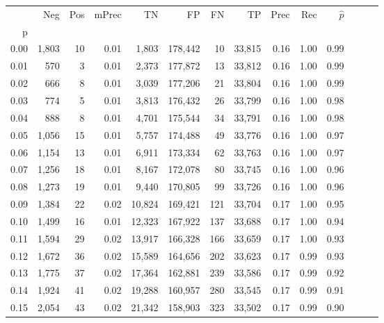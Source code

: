 \begin{tabular}{rrrrrrrrrrrrrr}
\toprule
{} &    Neg &  Pos & mPrec &       TN &       FP &      FN &      TP &  Prec &   Rec & $\hat{p}$ \\
p    &        &      &       &          &          &         &         &       &       &           \\
\midrule
0.00 &  1,803 &   10 &  0.01 &    1,803 &  178,442 &      10 &  33,815 &  0.16 &  1.00 &      0.99 \\
0.01 &    570 &    3 &  0.01 &    2,373 &  177,872 &      13 &  33,812 &  0.16 &  1.00 &      0.99 \\
0.02 &    666 &    8 &  0.01 &    3,039 &  177,206 &      21 &  33,804 &  0.16 &  1.00 &      0.99 \\
0.03 &    774 &    5 &  0.01 &    3,813 &  176,432 &      26 &  33,799 &  0.16 &  1.00 &      0.98 \\
0.04 &    888 &    8 &  0.01 &    4,701 &  175,544 &      34 &  33,791 &  0.16 &  1.00 &      0.98 \\
0.05 &  1,056 &   15 &  0.01 &    5,757 &  174,488 &      49 &  33,776 &  0.16 &  1.00 &      0.97 \\
0.06 &  1,154 &   13 &  0.01 &    6,911 &  173,334 &      62 &  33,763 &  0.16 &  1.00 &      0.97 \\
0.07 &  1,256 &   18 &  0.01 &    8,167 &  172,078 &      80 &  33,745 &  0.16 &  1.00 &      0.96 \\
0.08 &  1,273 &   19 &  0.01 &    9,440 &  170,805 &      99 &  33,726 &  0.16 &  1.00 &      0.96 \\
0.09 &  1,384 &   22 &  0.02 &   10,824 &  169,421 &     121 &  33,704 &  0.17 &  1.00 &      0.95 \\
0.10 &  1,499 &   16 &  0.01 &   12,323 &  167,922 &     137 &  33,688 &  0.17 &  1.00 &      0.94 \\
0.11 &  1,594 &   29 &  0.02 &   13,917 &  166,328 &     166 &  33,659 &  0.17 &  1.00 &      0.93 \\
0.12 &  1,672 &   36 &  0.02 &   15,589 &  164,656 &     202 &  33,623 &  0.17 &  0.99 &      0.93 \\
0.13 &  1,775 &   37 &  0.02 &   17,364 &  162,881 &     239 &  33,586 &  0.17 &  0.99 &      0.92 \\
0.14 &  1,924 &   41 &  0.02 &   19,288 &  160,957 &     280 &  33,545 &  0.17 &  0.99 &      0.91 \\
0.15 &  2,054 &   43 &  0.02 &   21,342 &  158,903 &     323 &  33,502 &  0.17 &  0.99 &      0.90 \\

\end{tabular}
